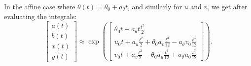 \begin{important}
  In the affine case where $\theta(t) = \theta_0 + a_\theta t$, and similarly for $u$ and $v$, we get after evaluating the integrals:
  \begin{equation*}
    \begin{bmatrix}
      a(t) \\
      b(t) \\
      x(t) \\
      y(t)
    \end{bmatrix} \approx \exp \left( \begin{bmatrix} \theta_0 t + a_\theta t \frac{t^2}{2}                                                 \\
      u_0 t + a_u \frac{t^2}{2} + \theta_0 a_v \frac{t^3}{12} - a_\theta v_0 \frac{t^3}{12} \\
      v_0 t + a_v \frac{t^2}{2} - \theta_0 a_u \frac{t^3}{12} + a_\theta u_0 \frac{t^3}{12}\end{bmatrix} \right).
  \end{equation*}
\end{important}

